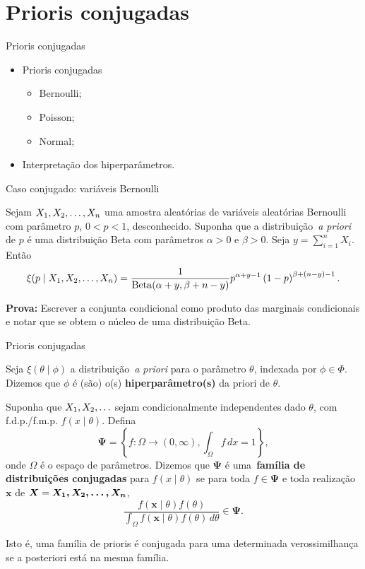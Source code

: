 \section*{Prioris conjugadas}
\begin{frame}{Prioris conjugadas}
 \begin{itemize}
  \item Prioris conjugadas
  \begin{itemize}
   \item Bernoulli;
   \item Poisson;
   \item Normal;
  \end{itemize}
\item Interpretação dos hiperparâmetros.
 \end{itemize}
\end{frame}

\begin{frame}{Caso conjugado: variáveis Bernoulli}
\begin{theo}
\label{thm:Bernoulli_posterior}
 Sejam $X_1, X_2, \ldots, X_n$ uma amostra aleatórias de variáveis aleatórias Bernoulli com parâmetro $p$, $ 0 < p < 1$, desconhecido.
 Suponha que a distribuição~\textit{a priori} de $p$ é uma distribuição Beta com parâmetros $\alpha > 0$ e $\beta > 0$.
 Seja $y = \sum_{i=1}^n X_i$. 
 Então
\[ \xi(p \mid X_1, X_2, \ldots, X_n) = \frac{1}{\operatorname{Beta}(\alpha + y, \beta + n -y)} p^{\alpha + y- 1} \left(1-p\right)^{\beta + (n-y) - 1}.\]
\end{theo}
\textbf{Prova:}
 Escrever a conjunta condicional como produto das marginais condicionais e notar que se obtem o núcleo de uma distribuição Beta.
\end{frame}

\begin{frame}{Prioris conjugadas}

\begin{defn}
Seja $\xi(\theta \mid \phi)$ a distribuição~\textit{a priori} para o parâmetro $\theta$, indexada por $\phi \in \Phi$.
  Dizemos que $\phi$ é (são) o(s) \textbf{hiperparâmetro(s)} da priori de $\theta$.
 \end{defn}

\begin{defn}
Suponha que $X_1, X_2, \ldots$ sejam condicionalmente independentes dado $\theta$, com f.d.p./f.m.p. $f(x \mid \theta)$.
Defina
\[ \boldsymbol{\Psi} = \left\{ f : \Omega \to (0, \infty) ,  \int_{\Omega} f\, dx = 1  \right\}, \]
onde $\Omega$ é o espaço de parâmetros.
Dizemos que $\boldsymbol{\Psi}$ é uma~\textbf{família de distribuições conjugadas} para $f(x \mid \theta)$ se para toda $f \in \boldsymbol{\Psi}$ e toda realização $\boldsymbol{x}$ de $\boldsymbol X = \boldsymbol{X_1, X_2, \ldots, X_n}$,
\[ \frac{f(\boldsymbol{x} \mid \theta) f(\theta)}{\int_{\Omega} f(\boldsymbol{x} \mid \theta) f(\theta)\,d\theta} \in \boldsymbol{\Psi}. \]
\end{defn}
Isto é, uma família de prioris é conjugada para uma determinada verossimilhança se a posteriori está na mesma família.
\end{frame}

